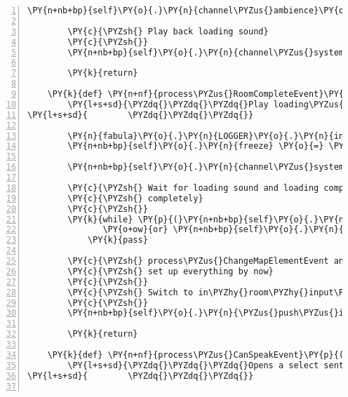 \begin{Verbatim}[commandchars=\\\{\},numbers=left,firstnumber=1,stepnumber=1]
            \PY{n+nb+bp}{self}\PY{o}{.}\PY{n}{channel\PYZus{}ambience}\PY{o}{.}\PY{n}{pause}\PY{p}{(}\PY{p}{)}

        \PY{c}{\PYZsh{} Play back loading sound}
        \PY{c}{\PYZsh{}}
        \PY{n+nb+bp}{self}\PY{o}{.}\PY{n}{channel\PYZus{}system}\PY{o}{.}\PY{n}{play}\PY{p}{(}\PY{n+nb+bp}{self}\PY{o}{.}\PY{n}{loading\PYZus{}sound}\PY{p}{)}

        \PY{k}{return}

    \PY{k}{def} \PY{n+nf}{process\PYZus{}RoomCompleteEvent}\PY{p}{(}\PY{n+nb+bp}{self}\PY{p}{,} \PY{n}{event}\PY{p}{)}\PY{p}{:}
        \PY{l+s+sd}{\PYZdq{}\PYZdq{}\PYZdq{}Play loading\PYZus{}complete\PYZus{}sound and change input state to INPUT\PYZus{}STATE\PYZus{}IN\PYZus{}ROOM.}
\PY{l+s+sd}{        \PYZdq{}\PYZdq{}\PYZdq{}}

        \PY{n}{fabula}\PY{o}{.}\PY{n}{LOGGER}\PY{o}{.}\PY{n}{info}\PY{p}{(}\PY{l+s}{\PYZdq{}}\PY{l+s}{unfreezing}\PY{l+s}{\PYZdq{}}\PY{p}{)}
        \PY{n+nb+bp}{self}\PY{o}{.}\PY{n}{freeze} \PY{o}{=} \PY{n+nb+bp}{False}

        \PY{n+nb+bp}{self}\PY{o}{.}\PY{n}{channel\PYZus{}system}\PY{o}{.}\PY{n}{queue}\PY{p}{(}\PY{n+nb+bp}{self}\PY{o}{.}\PY{n}{loading\PYZus{}complete\PYZus{}sound}\PY{p}{)}

        \PY{c}{\PYZsh{} Wait for loading sound and loading complete sound to be played}
        \PY{c}{\PYZsh{} completely}
        \PY{c}{\PYZsh{}}
        \PY{k}{while} \PY{p}{(}\PY{n+nb+bp}{self}\PY{o}{.}\PY{n}{channel\PYZus{}system}\PY{o}{.}\PY{n}{get\PYZus{}busy}\PY{p}{(}\PY{p}{)}
               \PY{o+ow}{or} \PY{n+nb+bp}{self}\PY{o}{.}\PY{n}{channel\PYZus{}system}\PY{o}{.}\PY{n}{get\PYZus{}queue}\PY{p}{(}\PY{p}{)} \PY{o+ow}{is} \PY{o+ow}{not} \PY{n+nb+bp}{None}\PY{p}{)}\PY{p}{:}
            \PY{k}{pass}

        \PY{c}{\PYZsh{} process\PYZus{}ChangeMapElementEvent and process\PYZus{}SpawnEvent should have}
        \PY{c}{\PYZsh{} set up everything by now}
        \PY{c}{\PYZsh{}}
        \PY{c}{\PYZsh{} Switch to in\PYZhy{}room\PYZhy{}input\PYZhy{}state to collect the right input}
        \PY{c}{\PYZsh{}}
        \PY{n+nb+bp}{self}\PY{o}{.}\PY{n}{\PYZus{}push\PYZus{}input\PYZus{}state\PYZus{}on\PYZus{}stack}\PY{p}{(}\PY{n+nb+bp}{self}\PY{o}{.}\PY{n}{INPUT\PYZus{}STATE\PYZus{}IN\PYZus{}ROOM}\PY{p}{)}

        \PY{k}{return}

    \PY{k}{def} \PY{n+nf}{process\PYZus{}CanSpeakEvent}\PY{p}{(}\PY{n+nb+bp}{self}\PY{p}{,} \PY{n}{event}\PY{p}{)}\PY{p}{:}
        \PY{l+s+sd}{\PYZdq{}\PYZdq{}\PYZdq{}Opens a select sentence menu with the events sentences.}
\PY{l+s+sd}{        \PYZdq{}\PYZdq{}\PYZdq{}}


\end{Verbatim}
